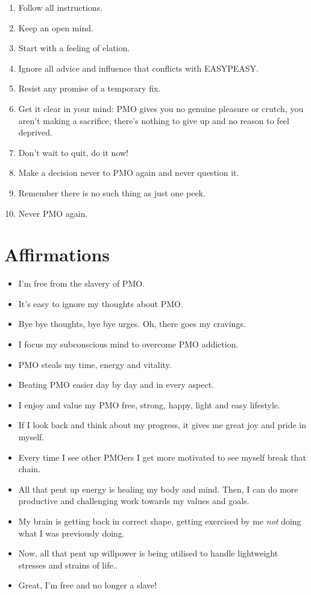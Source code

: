 \documentclass[easypeasy.tex]{subfiles}
\begin{document}
\begin{enumerate}
\item Follow all instructions.
\item Keep an open mind.
\item Start with a feeling of elation.
\item Ignore all advice and influence that conflicts with EASYPEASY.
\item Resist any promise of a temporary fix.
\item Get it clear in your mind: PMO gives you no genuine pleasure or crutch, you aren't making a sacrifice, there's nothing to give up and no reason to feel deprived.
\item Don't wait to quit, do it now!
\item Make a decision never to PMO again and never question it.
\item Remember there is no such thing as just one peek.
\item Never PMO again.
\end{enumerate}

\section{Affirmations}

\begin{itemize}
\item I'm free from the slavery of PMO.
\item It's easy to ignore my thoughts about PMO.
\item Bye bye thoughts, bye bye urges. Oh, there goes my cravings.
\item I focus my subconscious mind to overcome PMO addiction.
\item PMO steals my time, energy and vitality.
\item Beating PMO easier day by day and in every aspect.
\item I enjoy and value my PMO free, strong, happy, light and easy lifestyle.
\item If I look back and think about my progress, it gives me great joy and pride in myself.
\item Every time I see other PMOers I get more motivated to see myself break that chain.
\item All that pent up energy is healing my body and mind. Then, I can do more productive and challenging work towards my values and goals.
\item My brain is getting back in correct shape, getting exercised by me \textit{not} doing what I was previously doing.
\item Now, all that pent up willpower is being utilised to handle lightweight stresses and strains of life..
\item Great, I'm free and no longer a slave!
\end{itemize}
\end{document}
